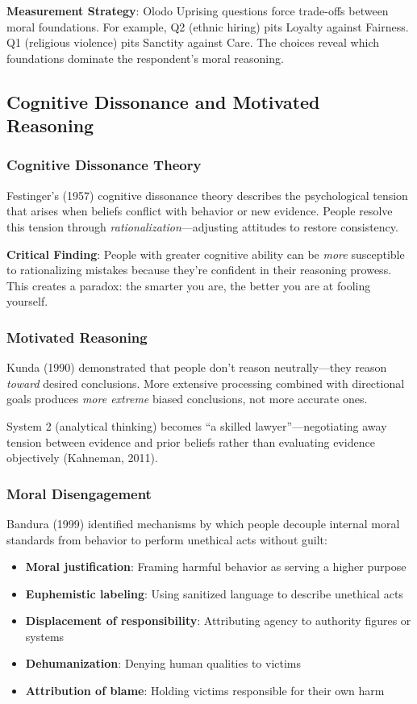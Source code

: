 \documentclass[11pt,a4paper]{article}
\begin{document}
\textbf{Measurement Strategy}: Olodo Uprising questions force trade-offs between moral foundations. For example, Q2 (ethnic hiring) pits Loyalty against Fairness. Q1 (religious violence) pits Sanctity against Care. The choices reveal which foundations dominate the respondent's moral reasoning.

\subsection{Cognitive Dissonance and Motivated Reasoning}

\subsubsection{Cognitive Dissonance Theory}

Festinger's (1957) cognitive dissonance theory describes the psychological tension that arises when beliefs conflict with behavior or new evidence. People resolve this tension through \textit{rationalization}—adjusting attitudes to restore consistency.

\textbf{Critical Finding}: People with greater cognitive ability can be \textit{more} susceptible to rationalizing mistakes because they're confident in their reasoning prowess. This creates a paradox: the smarter you are, the better you are at fooling yourself.

\subsubsection{Motivated Reasoning}

Kunda (1990) demonstrated that people don't reason neutrally—they reason \textit{toward} desired conclusions. More extensive processing combined with directional goals produces \textit{more extreme} biased conclusions, not more accurate ones.

System 2 (analytical thinking) becomes ``a skilled lawyer''—negotiating away tension between evidence and prior beliefs rather than evaluating evidence objectively (Kahneman, 2011).

\subsubsection{Moral Disengagement}

Bandura (1999) identified mechanisms by which people decouple internal moral standards from behavior to perform unethical acts without guilt:
\begin{itemize}[leftmargin=*]
    \item \textbf{Moral justification}: Framing harmful behavior as serving a higher purpose
    \item \textbf{Euphemistic labeling}: Using sanitized language to describe unethical acts
    \item \textbf{Displacement of responsibility}: Attributing agency to authority figures or systems
    \item \textbf{Dehumanization}: Denying human qualities to victims
    \item \textbf{Attribution of blame}: Holding victims responsible for their own harm
\end{itemize}
\end{document}
